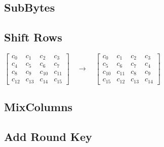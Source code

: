 \subsection{SubBytes}

\subsection{Shift Rows}

\noindent
\flushleft
\(
\begin{bmatrix}
c_0  & c_1  & c_2  & c_3  \\
c_4  & c_5  & c_6  & c_7  \\
c_8  & c_9  & c_{10} & c_{11} \\
c_{12} & c_{13} & c_{14} & c_{15}
\end{bmatrix}
\quad \rightarrow \quad
\begin{bmatrix}
c_0  & c_1  & c_2  & c_3  \\
c_5  & c_6  & c_7  & c_4  \\
c_{10} & c_{11} & c_8  & c_9  \\
c_{15} & c_{12} & c_{13} & c_{14}
\end{bmatrix}
\)
\flushleft
\subsection{MixColumns}
\subsection{Add Round Key}
